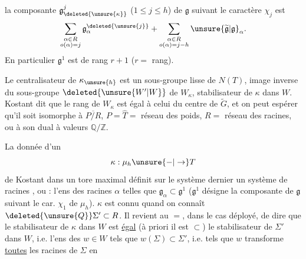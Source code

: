 la composante ${\mathfrak g}^{j}_{\deleted{\unsure{\kappa}}}$ ($1\leq j\leq h$) de $\mathfrak g$ suivant le caractère $\chi_j$ est
\[
\sum_{\substack{\alpha\in R\\o(\alpha)=j}}\mathfrak g^{\deleted{\unsure{j}}}_{\alpha}
+\sum_{\substack{\alpha\in R\\o(\alpha)=j-h}}\unsure{\widetilde{\mathfrak g}|\mathfrak g}_{\alpha}.
\]
En particulier $\mathfrak g^{1}$ est de rang $r+1$ ($r=$ rang).

Le centralisateur de $\kappa_{\unsure{h}}$ est un sous-groupe lisse de $N(T)$, image inverse du sous-groupe $\deleted{\unsure{W'|W}}$ de $W_{\kappa}$,  stabilisateur de $\kappa$ dans $W$. Kostant dit que le rang de $W_{\kappa}$ est égal à celui du centre de $\widetilde G$, et on peut espérer qu'il soit isomorphe à $\overline{P/R}$, $P=\widehat T=$ réseau des poids, $R=$ réseau des racines,  ou à son dual  à valeurs  $\mathbb Q/\mathbb Z$.

La donnée d'un
\[
\kappa:\mu_h\unsure{-|\to}T
\]
de Kostant dans un tore maximal définit sur le système dernier un système de racines , ou  : l'ens des racines $\alpha$ telles que $\mathfrak g_{\alpha}\subset\mathfrak g^1$ ($\mathfrak g^1$ désigne la composante de $\mathfrak g$ suivant le car. $\chi_1$ de $\mu_h$).  $\kappa$ est connu quand on connaît $\deleted{\unsure{Q}}\Sigma'\subset R$.  Il revient au $=$, dans le cas déployé, de dire que le  stabilisateur de $\kappa$ dans $W$ est \uline{égal} (à priori il est $\subset$) le stabilisateur de $\Sigma'$ dans $W$, i.e. l'ens des $w\in W$ tels que $w(\Sigma)\subset\Sigma'$, i.e. tels que $w$ transforme \uline{toutes} les racines de $\Sigma$ en

